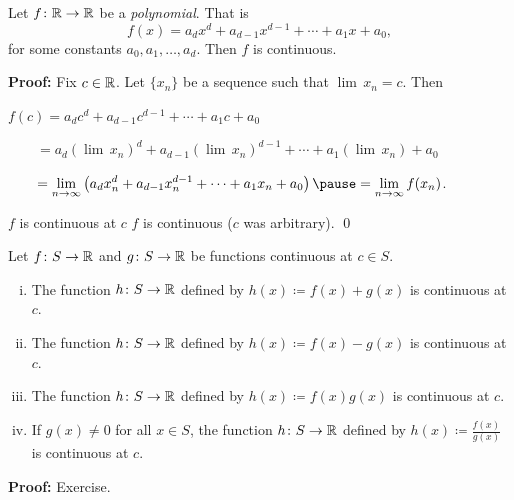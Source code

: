 \documentclass[10pt,aspectratio=169]{beamer}
\begin{document}
\begin{frame}

\begin{proposition}
Let $f \colon {\mathbb{R}} \to {\mathbb{R}}$ be a \emph{polynomial}.  That is
\begin{equation*}
f(x) = a_d x^d + a_{d-1} x^{d-1} + \cdots + a_1 x + a_0 ,
\end{equation*}
for some constants $a_0, a_1, \ldots, a_d$.
Then $f$ is continuous.
\end{proposition}

\pause
\textbf{Proof:}
Fix $c \in {\mathbb{R}}$.  
\pause
Let $\{ x_n \}$ be a sequence such that
$\lim\, x_n = c$.
\pause
Then

\medskip

$\displaystyle
f(c) =
a_d c^d + a_{d-1} c^{d-1} + \cdots + a_1 c + a_0 
$

\pause
\medskip

$\displaystyle
\qquad = 
a_d {(\lim\, x_n)}^d + a_{d-1} {(\lim\, x_n)}^{d-1} + \cdots + a_1 (\lim\, x_n) + a_0 
$

\pause
\medskip

$\displaystyle
\qquad = 
\lim_{n \to \infty}
\left(
a_d x_n^d + a_{d-1} x_n^{d-1} + \cdots + a_1 x_n + a_0 
\right)
\pause
=
\lim_{n \to \infty}
f(x_n)$.

\pause
\medskip

\thus \quad $f$ is continuous at $c$
\pause
\wthus
$f$ is continuous ($c$ was arbitrary).
\qed

\end{frame}

\begin{frame}

\begin{proposition}
Let $f \colon S \to {\mathbb{R}}$ and $g \colon S \to {\mathbb{R}}$ be functions
continuous at $c \in S$.
\begin{enumerate}[(i)]
\item
\pause
The function $h \colon S \to {\mathbb{R}}$ defined by
$h(x) \coloneqq f(x)+g(x)$ is continuous at $c$.
\item
\pause
The function $h \colon S \to {\mathbb{R}}$ defined by
$h(x) \coloneqq f(x)-g(x)$ is continuous at $c$.
\item
\pause
The function $h \colon S \to {\mathbb{R}}$ defined by
$h(x) \coloneqq f(x)g(x)$ is continuous at $c$.
\item
\pause
If $g(x)\not=0$ for all $x \in S$, the function $h \colon S \to {\mathbb{R}}$
defined by $h(x) \coloneqq \frac{f(x)}{g(x)}$ is continuous at $c$.
\end{enumerate}
\end{proposition}

\pause
\textbf{Proof:} Exercise.

\end{frame}
\end{document}
